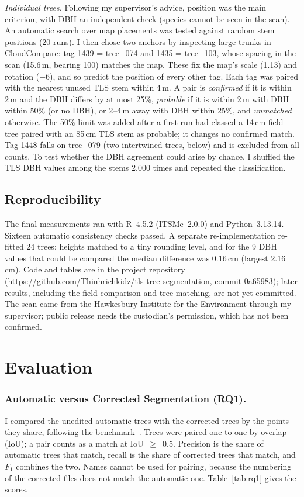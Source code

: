 \documentclass[runningheads]{llncs}
\begin{document}
\emph{Individual trees.} Following my supervisor's advice, position was the main criterion, with DBH an independent check (species cannot be seen in the scan). An automatic search over map placements was tested against random stem positions (20 runs). I then chose two anchors by inspecting large trunks in CloudCompare: tag 1439 = tree\_074 and 1435 = tree\_103, whose spacing in the scan (15.6\,m, bearing 100\textdegree) matches the map. These fix the map's scale (1.13) and rotation ($-$6\textdegree), and so predict the position of every other tag. Each tag was paired with the nearest unused TLS stem within 4\,m. A pair is \emph{confirmed} if it is within 2\,m and the DBH differs by at most 25\%, \emph{probable} if it is within 2\,m with DBH within 50\% (or no DBH), or 2--4\,m away with DBH within 25\%, and \emph{unmatched} otherwise. The 50\% limit was added after a first run had classed a 14\,cm field tree paired with an 85\,cm TLS stem as probable; it changes no confirmed match. Tag 1448 falls on tree\_079 (two intertwined trees, below) and is excluded from all counts. To test whether the DBH agreement could arise by chance, I shuffled the TLS DBH values among the stems 2,000 times and repeated the classification.

\subsection{Reproducibility}\label{sec:repro}
{\sloppy The final measurements ran with R~4.5.2 (ITSMe~2.0.0) and Python~3.13.14. Sixteen automatic consistency checks passed. A separate re-implementation re-fitted 24 trees; heights matched to a tiny rounding level, and for the 9 DBH values that could be compared the median difference was 0.16\,cm (largest 2.16\,cm). Code and tables are in the project repository (\url{https://github.com/Thinhrichkidz/tls-tree-segmentation}, commit 0a65983); later results, including the field comparison and tree matching, are not yet committed. The scan came from the Hawkesbury Institute for the Environment through my supervisor; public release needs the custodian's permission, which has not been confirmed.\par}

\section{Evaluation}\label{sec:eval}
\subsubsection{Automatic versus Corrected Segmentation (RQ1).}
I compared the unedited automatic trees with the corrected trees by the points they share, following the benchmark~\cite{cherlet2026}. Trees were paired one-to-one by overlap (IoU); a pair counts as a match at IoU~$\geq$~0.5. Precision is the share of automatic trees that match, recall is the share of corrected trees that match, and $F_1$ combines the two. Names cannot be used for pairing, because the numbering of the corrected files does not match the automatic one. Table~\ref{tab:rq1} gives the scores.
\end{document}

